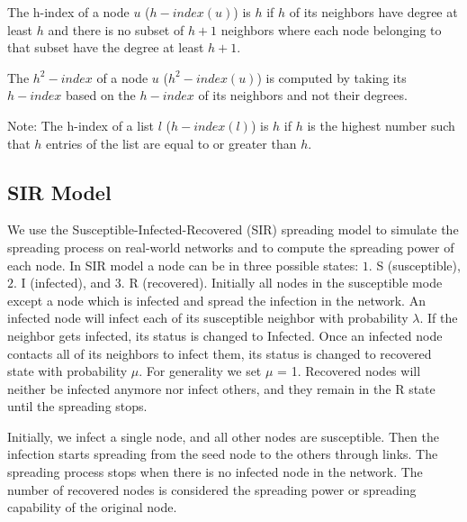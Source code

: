 \documentclass[conference]{IEEEtran}
\begin{document}
The h-index of a node $u$ ($h-index(u)$) is $h$ if $h$ of its neighbors have degree at least $h$ and there is no subset of $h+1$ neighbors where each node belonging to that subset have the degree at least $h+1$.

The $h^2-index$ of a node $u$ ($h^2-index(u)$) is computed by taking its $h-index$ based on the $h-index$ of its neighbors and not their degrees.

Note: The h-index of a list $l$ ($h-index(l)$) is $h$ if $h$ is the highest number such that $h$ entries of the list are equal to or greater than $h$.


\subsection{SIR Model}\label{secsir}

We use the Susceptible-Infected-Recovered (SIR) spreading model to simulate the spreading process on real-world networks and to compute the spreading power of each node. In SIR model a node can be in three possible states: $1.$ S (susceptible), $2.$ I (infected), and $3.$ R (recovered). Initially all nodes in the susceptible mode except a node which is infected and spread the infection in the network. An infected node will infect each of its susceptible neighbor with probability $\lambda$. If the neighbor gets infected, its status is changed to Infected. Once an infected node contacts all of its neighbors to infect them, its status is changed to recovered state with probability $\mu$. For generality we set $\mu$ = 1. Recovered nodes will neither be infected anymore nor infect others, and they remain in the R state until the spreading stops. 

Initially, we infect a single node, and all other nodes are susceptible. Then the infection starts spreading from the seed node to the others through links. The spreading process stops when there is no infected node in the network. The number of recovered nodes is considered the spreading power or spreading capability of the original node. 
\end{document}

